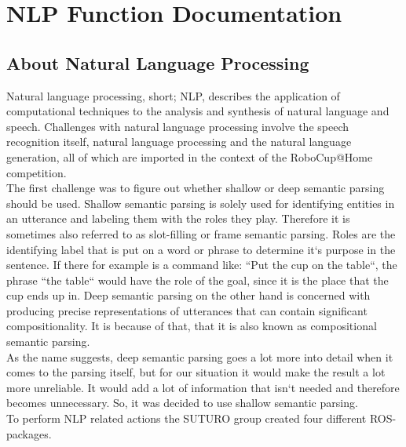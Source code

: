\documentclass[main.tex]{subfiles}
\begin{document}
\renewcommand{\cleardoublepage}{}   
\renewcommand{\clearpage}{}
\newpage

\chapter{NLP Function Documentation}


\section{About Natural Language Processing}
    Natural language processing, short; NLP, describes the application of computational techniques to the analysis and synthesis of natural language and speech. Challenges with natural language processing involve the speech recognition itself, natural language processing and the natural language generation, all of which are imported in the context of the RoboCup@Home competition.\\ 
    The first challenge was to figure out whether shallow or deep semantic parsing should be used. Shallow semantic parsing is solely used for identifying entities in an utterance and labeling them with the roles they play. Therefore it is sometimes also referred to as slot-filling or frame semantic parsing. Roles are the identifying label that is put on a word or phrase to determine it‘s purpose in the sentence. If there for example is a command like: “Put the cup on the table“, the phrase “the table“ would have the role of the goal, since it is the place that the cup ends up in.
Deep semantic parsing on the other hand is concerned with producing precise representations of utterances that can contain significant compositionality. It is because of that, that it is also known as compositional semantic parsing.\\ 
  As the name suggests, deep semantic parsing goes a lot more into detail when it comes to the parsing itself, but for our situation it would make the result a lot more unreliable. It would add a lot of information that isn‘t needed and therefore becomes unnecessary. So, it was decided to use shallow semantic parsing.\\
    
    To perform NLP related actions the SUTURO group created four different ROS-packages.
\end{document}
